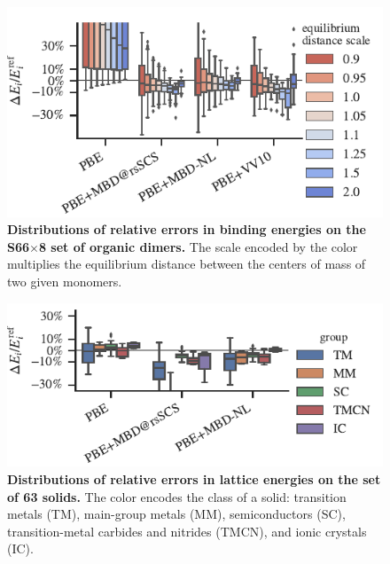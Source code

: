 \begin{figure}[t!]
\centering
\includegraphics{../media/s66-errors.pdf}
\caption{\textbf{Distributions of relative errors in binding energies on the S66$\times$8 set of organic dimers.}
The scale encoded by the color multiplies the equilibrium distance between the centers of mass of two given monomers.
}\label{fig:s66-errors}
\end{figure}

\begin{figure}[t!]
\centering
\includegraphics{../media/solids-errors.pdf}
\caption{\textbf{Distributions of relative errors in lattice energies on the set of 63 solids.}
The color encodes the class of a solid: transition metals (TM), main-group metals (MM), semiconductors (SC), transition-metal carbides and nitrides (TMCN), and ionic crystals (IC).
}\label{fig:solids-errors}
\end{figure}

